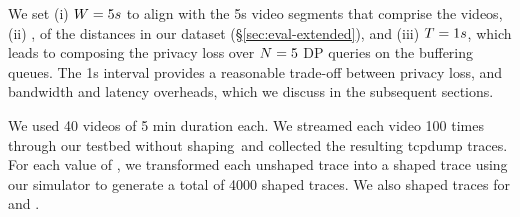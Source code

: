 We set (i) $W = 5s$ to align with the 5s video segments that comprise the
videos, (ii) , 
of the distances in our dataset (\S\ref{sec:eval-extended}), and
(iii) $T = 1s$, which
leads to composing the privacy loss over $N = 5$ DP queries on
the buffering queues. The 1s interval provides a reasonable trade-off between
privacy loss, and bandwidth and latency overheads, which we
discuss in the subsequent sections.
%

We used 40 videos of 5 min duration each. We streamed each video 100 times
through our testbed without shaping~and collected the resulting tcpdump
traces. For each value of \update{$\varepsilon$}, we transformed each unshaped
trace into a shaped trace using our simulator to generate a total of 4000
shaped traces.
We also shaped traces for {\constshape} and {\pacer}.




